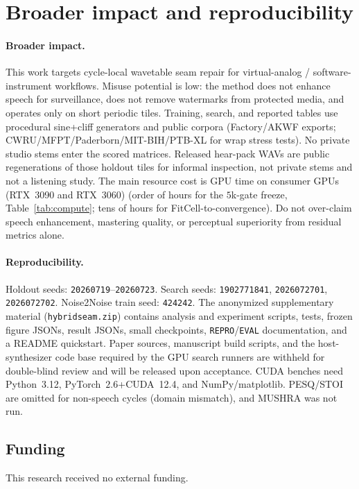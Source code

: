 \section{Broader impact and reproducibility}
\label{sec:ethics}

\paragraph{Broader impact.}
This work targets cycle-local wavetable seam repair for virtual-analog / software-instrument workflows.
Misuse potential is low: the method does not enhance speech for surveillance, does not remove watermarks from protected media, and operates only on short periodic tiles.
Training, search, and reported tables use procedural sine{+}cliff generators and public corpora (Factory/AKWF exports; CWRU/MFPT/Paderborn/MIT-BIH/PTB-XL for wrap stress tests).
No private studio stems enter the scored matrices.
Released hear-pack WAVs are public regenerations of those holdout tiles for informal inspection, not private stems and not a listening study.
The main resource cost is GPU time on consumer GPUs (RTX~3090 and RTX~3060) (order of hours for the $5$k-gate freeze, Table~\ref{tab:compute}; tens of hours for FitCell-to-convergence).
Do not over-claim speech enhancement, mastering quality, or perceptual superiority from residual metrics alone.

\paragraph{Reproducibility.}
Holdout seeds: \texttt{20260719}--\texttt{20260723}.
Search seeds: \texttt{1902771841}, \texttt{2026072701}, \texttt{2026072702}.
Noise2Noise train seed: \texttt{424242}.
The anonymized supplementary material (\texttt{hybridseam.zip}) contains analysis and experiment scripts, tests, frozen figure JSONs, result JSONs, small checkpoints, \texttt{REPRO}/\texttt{EVAL} documentation, and a README quickstart.
Paper sources, manuscript build scripts, and the host-synthesizer code base required by the GPU search runners are withheld for double-blind review and will be released upon acceptance.
CUDA benches need Python~3.12, PyTorch~$2.6$+CUDA~12.4, and NumPy/matplotlib.
PESQ/STOI are omitted for non-speech cycles (domain mismatch), and MUSHRA was not run.

\subsection{Funding}
\label{sec:funding}
This research received no external funding.


